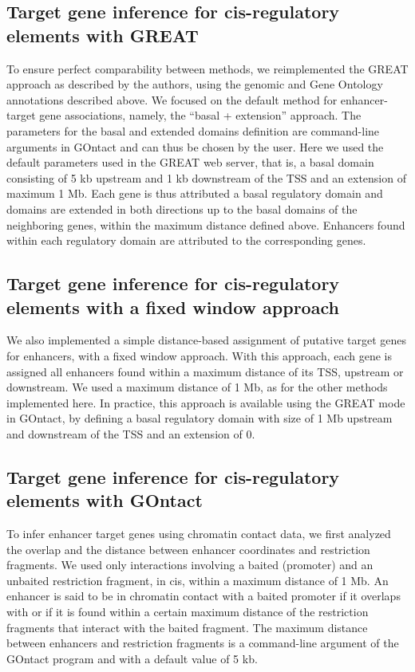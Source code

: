 \subsection*{Target gene inference for cis-regulatory elements with GREAT}
To ensure perfect comparability between methods, we reimplemented the GREAT approach as described by the authors, using the genomic and Gene Ontology annotations described above. We focused on the default method for enhancer-target gene associations, namely, the “basal + extension” approach. The parameters for the basal and extended domains definition are command-line arguments in GOntact and can thus be chosen by the user. Here we used the default parameters used in the GREAT web server, that is, a basal domain consisting of 5 kb upstream and 1 kb downstream of the TSS and an extension of maximum 1 Mb. Each gene is thus attributed a basal regulatory domain and domains are extended in both directions up to the basal domains of the neighboring genes, within the maximum distance defined above. Enhancers found within each regulatory domain are attributed to the corresponding genes. 

\subsection*{Target gene inference for cis-regulatory elements with a fixed window approach}
We also implemented a simple distance-based assignment of putative target genes for enhancers, with a fixed window approach. With this approach, each gene is assigned all enhancers found within a maximum distance of its TSS, upstream or downstream. We used a maximum distance of 1 Mb, as for the other methods implemented here. In practice, this approach is available using the GREAT mode in GOntact, by defining a basal regulatory domain with size of 1 Mb upstream and downstream of the TSS and an extension of 0. 

\subsection*{Target gene inference for cis-regulatory elements with GOntact}
To infer enhancer target genes using chromatin contact data, we first analyzed the overlap and the distance between enhancer coordinates and restriction fragments. We used only interactions involving a baited (promoter) and an unbaited restriction fragment, in cis, within a maximum distance of 1 Mb. An enhancer is said to be in chromatin contact with a baited promoter if it overlaps with or if it is found within a certain maximum distance of the restriction fragments that interact with the baited fragment. The maximum distance between enhancers and restriction fragments is a command-line argument of the GOntact program and with a default value of 5 kb. 

